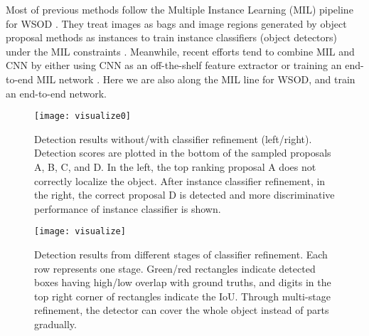 \documentclass[10pt,twocolumn,letterpaper]{article}
\begin{document}
Most of previous methods follow the Multiple Instance Learning (MIL) pipeline for WSOD \cite{Ref:Bilen2015,Ref:Bilen2016,Ref:Cibis2017,Ref:Kantorov2016,Ref:Song2014,Ref:Wang2014,Ref:Wang2015}.
They treat images as bags and image regions generated by object proposal methods \cite{Ref:Uijlings2013,Ref:Zitnick2014} as instances to train instance classifiers (object detectors) under the MIL constraints \cite{Ref:Dietterich1997}. Meanwhile, recent efforts tend to combine MIL and CNN by either using CNN as an off-the-shelf feature extractor \cite{Ref:Bilen2015,Ref:Cibis2017,Ref:Song2014,Ref:Wang2014,Ref:Wang2015} or training an end-to-end MIL network \cite{Ref:Bilen2016,Ref:Kantorov2016}.
Here we are also along the MIL line for WSOD, and train an end-to-end network.

\begin{figure}[t]
\begin{center}
   \texttt{[image: visualize0]}
\end{center}
   \caption{Detection results without/with classifier refinement (left/right).
   Detection scores are plotted in the bottom of the sampled proposals A, B, C, and D.
   In the left, the top ranking proposal A does not correctly localize the object.
   After instance classifier refinement, in the right, the correct proposal D is detected and more discriminative performance of instance classifier is shown.}
\label{fig:visualize0}
\end{figure}

\begin{figure*}[t]
\begin{center}
   \texttt{[image: visualize]}
\end{center}
   \caption{Detection results from different stages of classifier refinement.
   Each row represents one stage.
   Green/red rectangles indicate detected boxes having high/low overlap with ground truths, and digits in the top right corner of rectangles indicate the IoU.
   Through multi-stage refinement, the detector can cover the whole object instead of parts gradually.}
\label{fig:visualize}
\end{figure*}
\end{document}
